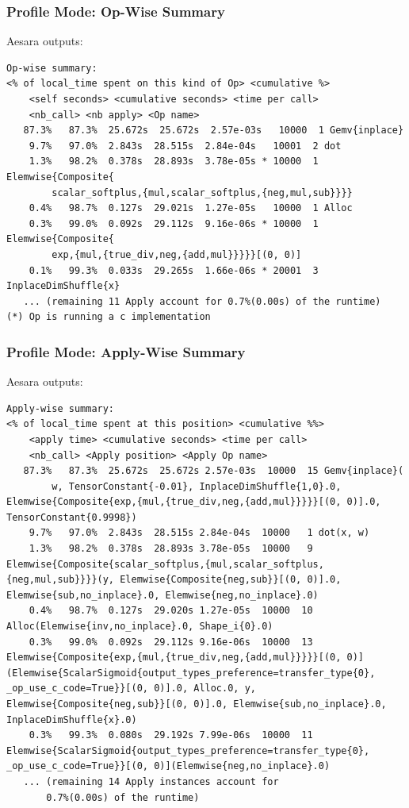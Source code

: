 \documentclass[a4paper,9pt]{beamer}
\begin{document}
\begin{frame}[fragile]
\frametitle{Profile Mode: Op-Wise Summary}
Aesara outputs:
\vfill
\begin{Verbatim}
Op-wise summary:
<% of local_time spent on this kind of Op> <cumulative %>
    <self seconds> <cumulative seconds> <time per call>
    <nb_call> <nb apply> <Op name>
   87.3%   87.3%  25.672s  25.672s  2.57e-03s   10000  1 Gemv{inplace}
    9.7%   97.0%  2.843s  28.515s  2.84e-04s   10001  2 dot
    1.3%   98.2%  0.378s  28.893s  3.78e-05s * 10000  1 Elemwise{Composite{
        scalar_softplus,{mul,scalar_softplus,{neg,mul,sub}}}}
    0.4%   98.7%  0.127s  29.021s  1.27e-05s   10000  1 Alloc
    0.3%   99.0%  0.092s  29.112s  9.16e-06s * 10000  1 Elemwise{Composite{
        exp,{mul,{true_div,neg,{add,mul}}}}}[(0, 0)]
    0.1%   99.3%  0.033s  29.265s  1.66e-06s * 20001  3 InplaceDimShuffle{x}
   ... (remaining 11 Apply account for 0.7%(0.00s) of the runtime)
(*) Op is running a c implementation
\end{Verbatim}
\end{frame}

\begin{frame}[fragile]
\frametitle{Profile Mode: Apply-Wise Summary}
Aesara outputs:
\vfill
\begin{Verbatim}
Apply-wise summary:
<% of local_time spent at this position> <cumulative %%>
    <apply time> <cumulative seconds> <time per call>
    <nb_call> <Apply position> <Apply Op name>
   87.3%   87.3%  25.672s  25.672s 2.57e-03s  10000  15 Gemv{inplace}(
        w, TensorConstant{-0.01}, InplaceDimShuffle{1,0}.0, Elemwise{Composite{exp,{mul,{true_div,neg,{add,mul}}}}}[(0, 0)].0, TensorConstant{0.9998})
    9.7%   97.0%  2.843s  28.515s 2.84e-04s  10000   1 dot(x, w)
    1.3%   98.2%  0.378s  28.893s 3.78e-05s  10000   9 Elemwise{Composite{scalar_softplus,{mul,scalar_softplus,{neg,mul,sub}}}}(y, Elemwise{Composite{neg,sub}}[(0, 0)].0, Elemwise{sub,no_inplace}.0, Elemwise{neg,no_inplace}.0)
    0.4%   98.7%  0.127s  29.020s 1.27e-05s  10000  10 Alloc(Elemwise{inv,no_inplace}.0, Shape_i{0}.0)
    0.3%   99.0%  0.092s  29.112s 9.16e-06s  10000  13 Elemwise{Composite{exp,{mul,{true_div,neg,{add,mul}}}}}[(0, 0)](Elemwise{ScalarSigmoid{output_types_preference=transfer_type{0}, _op_use_c_code=True}}[(0, 0)].0, Alloc.0, y, Elemwise{Composite{neg,sub}}[(0, 0)].0, Elemwise{sub,no_inplace}.0, InplaceDimShuffle{x}.0)
    0.3%   99.3%  0.080s  29.192s 7.99e-06s  10000  11 Elemwise{ScalarSigmoid{output_types_preference=transfer_type{0}, _op_use_c_code=True}}[(0, 0)](Elemwise{neg,no_inplace}.0)
   ... (remaining 14 Apply instances account for
       0.7%(0.00s) of the runtime)
\end{Verbatim}
\end{frame}
\end{document}
